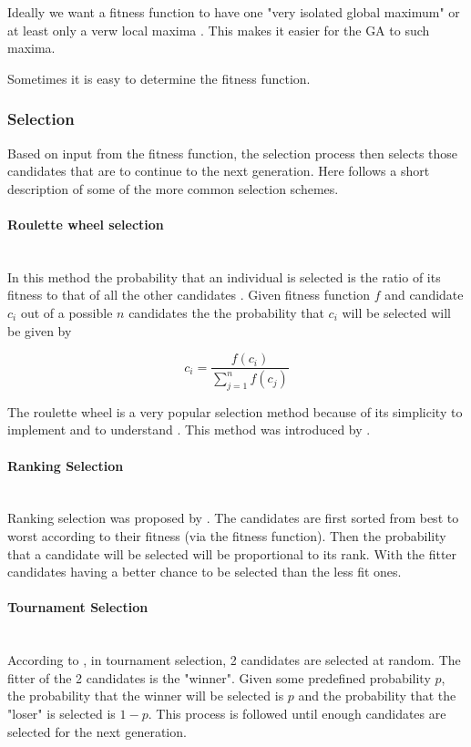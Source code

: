 \documentclass[12pt,a4paper]{report}
\newcommand{\subsubsubsection}[1]{\paragraph{#1}\mbox{}\\}
\begin{document}
Ideally we want a fitness function to have one "very isolated global maximum" or at least only a verw local maxima \citep{beasley}. This makes it easier for the GA to such maxima.

Sometimes it is easy to determine the fitness function.

\subsubsection{Selection}

Based on input from the fitness function, the selection process then selects those candidates that are to continue to the next generation. Here follows a short description of some of the more common selection schemes.

\subsubsubsection{Roulette wheel selection}

In this method the probability that an individual is selected is the ratio of its fitness to that of all the other candidates \citep{michell}. Given fitness function $f$ and candidate $c_i$ out of a possible $n$ candidates the the probability that $c_i$ will be selected will be given by

\begin{equation}
c_i = \frac{f(c_i)}{\sum_{j=1}^n f(c_j)}
\end{equation} 
    
The roulette wheel is a very popular selection method because of its simplicity to implement and to understand \citep{Lipowski2011}. This method was introduced by \cite{de1975analysis}.

\subsubsubsection{Ranking Selection}

Ranking selection was proposed by \cite{baker1985adaptive}. The candidates are first sorted from best to worst according to their fitness (via the fitness function). Then the probability that a candidate will be selected will be proportional to its rank. With the fitter candidates having a better chance to be selected than the less fit ones.

\subsubsubsection{Tournament Selection}

According to \citep{michell}, in tournament selection, 2 candidates are selected at random. The fitter of the 2 candidates is the "winner". Given some predefined probability $p$, the probability that the winner will be selected is $p$ and the probability that the "loser" is selected is $1-p$. This process is followed until enough candidates are selected for the next generation. 
\end{document}
